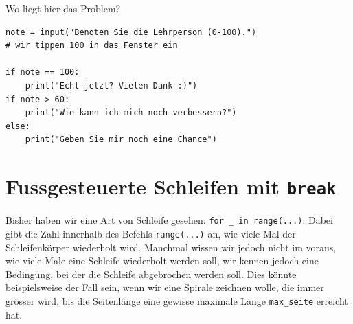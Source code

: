 \begin{figure}[H]
\centering
{}
\end{figure}

\begin{myexercise}
Wo liegt hier das Problem?
\begin{lstlisting}        
note = input("Benoten Sie die Lehrperson (0-100).") 
# wir tippen 100 in das Fenster ein

if note == 100:
    print("Echt jetzt? Vielen Dank :)")
if note > 60:
    print("Wie kann ich mich noch verbessern?")
else:
    print("Geben Sie mir noch eine Chance")
\end{lstlisting}
\end{myexercise}

\section{Fussgesteuerte Schleifen mit \lstinline|break|}
Bisher haben wir eine Art von Schleife gesehen: \lstinline|for _ in range(...)|. Dabei gibt die Zahl innerhalb des Befehls \lstinline|range(...)| an, wie viele Mal der Schleifenkörper wiederholt wird. Manchmal wissen wir jedoch nicht im voraus, wie viele Male eine Schleife wiederholt werden soll, wir kennen jedoch eine Bedingung, bei der die Schleife abgebrochen werden soll. Dies könnte beispielsweise der Fall sein, wenn wir eine Spirale zeichnen wolle, die immer grösser wird, bis die Seitenlänge eine gewisse maximale Länge \lstinline|max_seite| erreicht hat.



